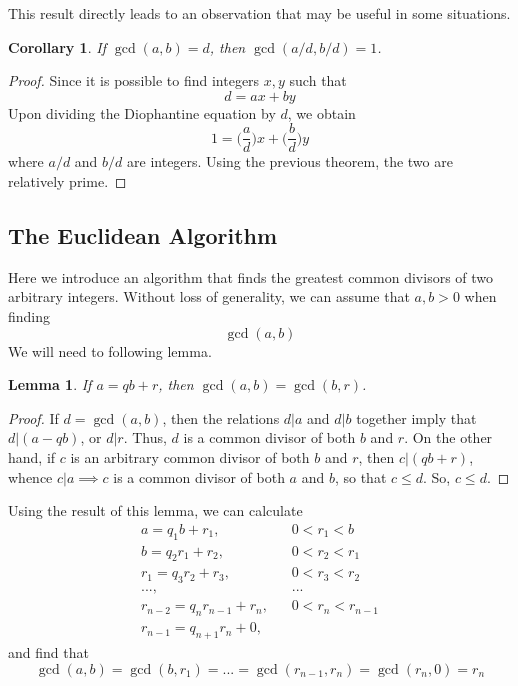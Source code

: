 \documentclass{article}
\newtheorem{lemma}[theorem]{Lemma}
\newtheorem{corollary}{Corollary}[theorem]
\theoremstyle{remark}
\theoremstyle{definition}
\begin{document}
This result directly leads to an observation that may be useful in some situations. 

\begin{corollary}
If $\gcd(a, b) = d$, then $\gcd(a/d, b/d) = 1$. 
\end{corollary}
\begin{proof}
Since it is possible to find integers $x, y$ such that 
\[d = ax + by\]
Upon dividing the Diophantine equation by $d$, we obtain 
\[1 = \bigg(\frac{a}{d}\bigg) x + \bigg( \frac{b}{d} \bigg) y\]
where $a/d$ and $b/d$ are integers. Using the previous theorem, the two are relatively prime. 
\end{proof}

\subsection{The Euclidean Algorithm}
Here we introduce an algorithm that finds the greatest common divisors of two arbitrary integers. Without loss of generality, we can assume that $a, b > 0$ when finding 
\[\gcd(a, b)\]
We will need to following lemma. 

\begin{lemma}
If $a = q b + r$, then $\gcd(a, b) = \gcd(b, r)$. 
\end{lemma}
\begin{proof}
If $d = \gcd(a, b)$, then the relations $d|a$ and $d|b$ together imply that $d|(a-qb)$, or $d|r$. Thus, $d$ is a common divisor of both $b$ and $r$. On the other hand, if $c$ is an arbitrary common divisor of both $b$ and $r$, then $c|(qb+r)$, whence $c|a \implies c$ is a common divisor of both $a$ and $b$, so that $c \leq d$. So, $c \leq d$. 
\end{proof}

Using the result of this lemma, we can calculate 
\begin{align*}
    a = q_1 b + r_1, \;\;\; & 0 < r_1 < b \\
    b = q_2 r_1 + r_2 , \;\;\; & 0 < r_2 < r_1 \\
    r_1 = q_3 r_2 + r_3 , \;\;\; & 0 < r_3 < r_2 \\
    ... , \;\;\; & ... \\
    r_{n-2} = q_n r_{n-1} + r_n , \;\;\; & 0 < r_n < r_{n-1} \\
    r_{n-1} = q_{n+1} r_n + 0, \;\;\; &
\end{align*}
and find that
\[\gcd(a, b) = \gcd(b, r_1) = ... = \gcd(r_{n-1}, r_n) = \gcd(r_n, 0) = r_n\]
\end{document}
